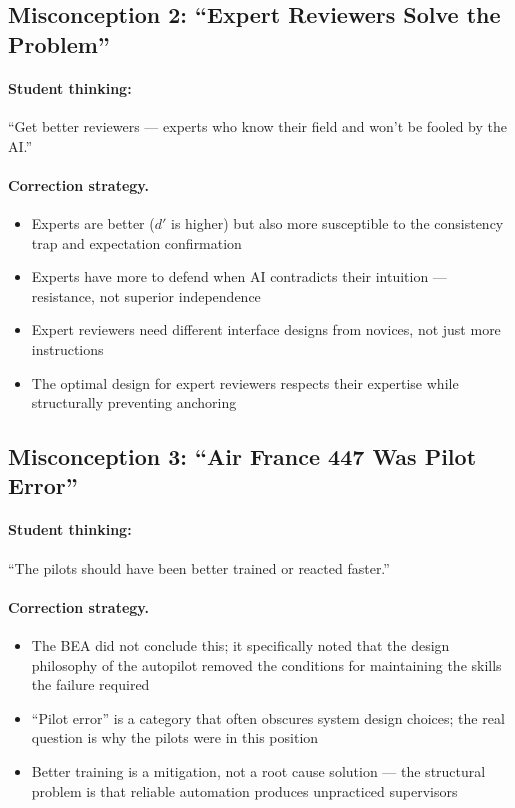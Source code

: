 \subsection{Misconception 2: ``Expert Reviewers Solve the Problem''}

\paragraph{Student thinking:} ``Get better reviewers --- experts who know their field and won't be fooled by the AI.''

\paragraph{Correction strategy.}
\begin{itemize}
    \item Experts are better ($d'$ is higher) but also more susceptible to the consistency trap and expectation confirmation
    \item Experts have more to defend when AI contradicts their intuition --- resistance, not superior independence
    \item Expert reviewers need different interface designs from novices, not just more instructions
    \item The optimal design for expert reviewers respects their expertise while structurally preventing anchoring
\end{itemize}

\subsection{Misconception 3: ``Air France 447 Was Pilot Error''}

\paragraph{Student thinking:} ``The pilots should have been better trained or reacted faster.''

\paragraph{Correction strategy.}
\begin{itemize}
    \item The BEA did not conclude this; it specifically noted that the design philosophy of the autopilot removed the conditions for maintaining the skills the failure required
    \item ``Pilot error'' is a category that often obscures system design choices; the real question is why the pilots were in this position
    \item Better training is a mitigation, not a root cause solution --- the structural problem is that reliable automation produces unpracticed supervisors
\end{itemize}

